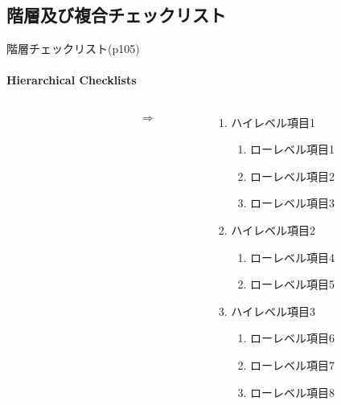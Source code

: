 \subsection{階層及び複合チェックリスト}
\begin{frame}{階層チェックリスト(p105)}
\framesubtitle{Hierarchical Checklists }
\begin{columns}
    \begin{column}{0.37\textwidth}
    \end{column}
    \begin{column}{0.04\textwidth}
    \Huge\[\Rightarrow\]
    \end{column}
    \begin{column}{0.49\textwidth}
    \begin{enumerate}
    \item ハイレベル項目1
        \begin{enumerate}
        \item ローレベル項目1
        \item ローレベル項目2
        \item ローレベル項目3
        \end{enumerate}
    \item ハイレベル項目2
        \begin{enumerate}
        \item ローレベル項目4
        \item ローレベル項目5
        \end{enumerate}
    \item ハイレベル項目3
        \begin{enumerate}
        \item ローレベル項目6
        \item ローレベル項目7
        \item ローレベル項目8
        \end{enumerate}
    \end{enumerate}
    \end{column}
\end{columns}
\end{frame}

